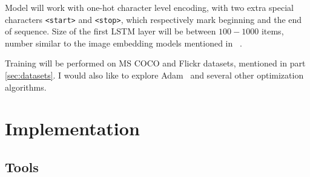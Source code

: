 Model will work with one-hot character level encoding, with two extra special characters \texttt{<start>} and \texttt{<stop>}, which respectively mark beginning and the end of sequence. Size of the first LSTM layer will be between $ 100-1000 $ items, number similar to the image embedding models mentioned in ~\cite{DBLP:journals/corr/VinyalsTBE14, DBLP:journals/corr/FangGISDDGHMPZZ14}.

Training will be performed on MS COCO and Flickr datasets, mentioned in part \ref{sec:datasets}. I would also like to explore Adam~\cite{DBLP:journals/corr/KingmaB14} and several other optimization algorithms.

%
%
%
%

\chapter{Implementation}

	\section{Tools}\label{chp:exper}

